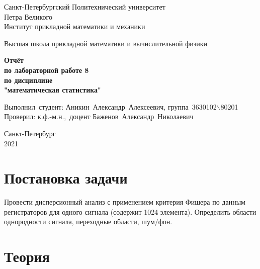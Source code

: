 \documentclass[12pt,a4paper]{article}
\begin{document}
	
	\begin{titlepage}
		
		\begin{center}
			\begin{large}
				Санкт-Петербургский Политехнический университет\\ Петра Великого\\
				Институт прикладной математики и механики\\
			\end{large}
			\vspace{0.2cm}
			Высшая школа прикладной математики и вычислительной физики\\
			
		\end{center}
		
		\vspace{3cm}
		\begin{center}
			\textbf{Отчёт\\ по лабораторной работе 8\\ по дисциплине\\ "математическая статистика"}
		\end{center}
		
		\vspace{3cm}
		\vbox{%
			\hfill%
			\vbox{%
				\hbox{Выполнил студент:}%
				\hbox{\break}
				\hbox{Аникин Александр Алексеевич,}%
				\hbox{группа 3630102$\backslash$80201}%
				\hbox{\break}
				\hbox{\break}
				\hbox{Проверил:}
				\hbox{\break}
				\hbox{к.ф.-м.н., доцент}
				\hbox{Баженов Александр Николаевич}
			}%
		} 
		\vfill
		
		\begin{center}
			Санкт-Петербург\\2021
		\end{center}
		
	\end{titlepage}
	\tableofcontents
	\newpage
	
	\listoffigures
	\newpage
	
	\listoftables
	\newpage	
	
	\section{Постановка задачи}
	Провести дисперсионный анализ с применением критерия Фишера по данным регистраторов для одного сигнала (содержит 1024 элемента). Определить области однородности сигнала, переходные области, шум/фон.
	\newpage
	
	\section{Теория}
\end{document}
